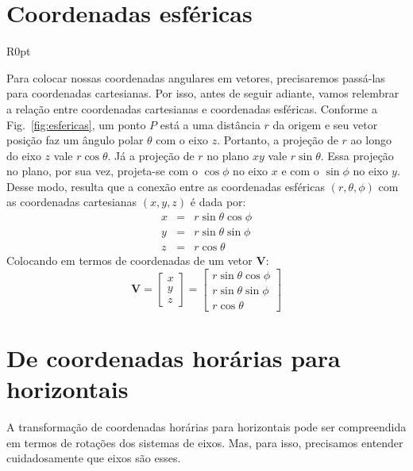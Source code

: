 \newpage
\section{Coordenadas esféricas}

\begin{wrapfigure}[20]{R}{0pt}

\caption{Coordenadas esféricas.}
\label{fig:esfericas}
\end{wrapfigure}
%
Para colocar nossas coordenadas angulares em vetores, precisaremos passá-las para coordenadas cartesianas. Por isso, antes de seguir adiante, vamos relembrar a relação entre coordenadas cartesianas e coordenadas esféricas. Conforme a Fig.~\ref{fig:esfericas}, um ponto $P$ está a uma distância $r$ da origem e seu vetor posição faz um ângulo polar $\theta$ com o eixo $z$. Portanto, a projeção de $r$ ao longo do eixo $z$ vale $r \cos \theta$. Já a projeção de $r$ no plano $xy$ vale $r \sin \theta$. Essa projeção no plano, por sua vez, projeta-se com o $\cos \phi$ no eixo $x$ e com o $\sin \phi$ no eixo $y$. Desse modo, resulta que a conexão entre as coordenadas esféricas $(r, \theta, \phi)$ com as coordenadas cartesianas $(x, y, z)$ é dada por:
%
\begin{eqnarray} 
x &=& r \sin \theta \cos \phi \\
y &=& r \sin \theta \sin \phi \\
z &=& r \cos \theta 
\end{eqnarray}
%
Colocando em termos de coordenadas de um vetor \textbf{V}:
%
\begin{equation}
\textbf{V} = 
\begin{bmatrix}
x \\
y \\
z
\end{bmatrix} = 
\begin{bmatrix}
r \sin \theta \cos \phi \\
r \sin \theta \sin \phi \\
r \cos \theta
\end{bmatrix}
\end{equation}


\section{De coordenadas horárias para horizontais}

A transformação de coordenadas horárias para horizontais pode ser compreendida em termos de rotações dos sistemas de eixos. Mas, para isso, precisamos entender cuidadosamente que eixos são esses.

